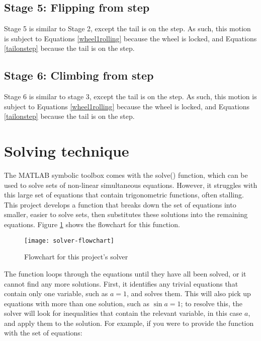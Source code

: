 \subsection*{Stage 5: Flipping from step}
Stage 5 is similar to Stage 2, except the tail is on the step. As such, this motion is subject to Equations \ref{wheel1rolling} because the wheel is locked, and Equations \ref{tailonstep} because the tail is on the step.\\

\subsection*{Stage 6: Climbing from step}
Stage 6 is similar to stage 3, except the tail is on the step. As such, this motion is subject to Equations \ref{wheel1rolling} because the wheel is locked, and Equations \ref{tailonstep} because the tail is on the step.\\

\section{Solving technique}
The MATLAB symbolic toolbox comes with the solve() function, which can be used to solve sets of non-linear simultaneous equations. However, it struggles with this large set of equations that contain trigonometric functions, often stalling. This project develops a function that breaks down the set of equations into smaller, easier to solve sets, then substitutes these solutions into the remaining equations. Figure \ref{fig:solver-flowchart} shows the flowchart for this function. \\

\begin{figure}[!!h]
	\centering
	\texttt{[image: solver-flowchart]}
	\caption{Flowchart for this project's solver}
	\label{fig:solver-flowchart}
\end{figure}
The function loops through the equations until they have all been solved, or it cannot find any more solutions. First, it identifies any trivial equations that contain only one variable, such as $a = 1$, and solves them. This will also pick up equations with more than one solution, such as $\sin{a} = 1$; to resolve this, the solver will look for inequalities that contain the relevant variable, in this case $a$, and apply them to the solution. For example, if you were to provide the function with the set of equations:\\

